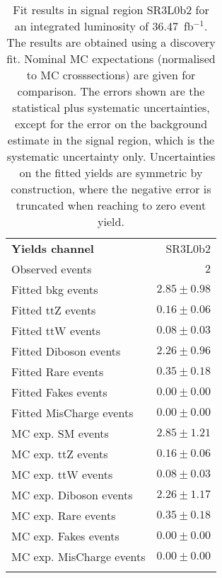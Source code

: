 

\begin{table}
\begin{center}
\setlength{\tabcolsep}{0.0pc}
{\small
\begin{tabular*}{\textwidth}{@{\extracolsep{\fill}}lr}
\noalign{\smallskip}\hline\noalign{\smallskip}
{\bfseries Yields channel}           & SR3L0b2              \\[-0.05cm]
\noalign{\smallskip}\hline\noalign{\smallskip}
Observed events          & $2$                    \\
\noalign{\smallskip}\hline\noalign{\smallskip}
Fitted bkg events         & $2.85 \pm 0.98$              \\
\noalign{\smallskip}\hline\noalign{\smallskip}
        Fitted ttZ events         & $0.16 \pm 0.06$              \\
        Fitted ttW events         & $0.08 \pm 0.03$              \\
        Fitted Diboson events         & $2.26 \pm 0.96$              \\
        Fitted Rare events         & $0.35 \pm 0.18$              \\
        Fitted Fakes events         & $0.00 \pm 0.00$              \\
        Fitted MisCharge events         & $0.00 \pm 0.00$              \\
 \noalign{\smallskip}\hline\noalign{\smallskip}
MC exp. SM events              & $2.85 \pm 1.21$              \\
\noalign{\smallskip}\hline\noalign{\smallskip}
        MC exp. ttZ events         & $0.16 \pm 0.06$              \\
        MC exp. ttW events         & $0.08 \pm 0.03$              \\
        MC exp. Diboson events         & $2.26 \pm 1.17$              \\
        MC exp. Rare events         & $0.35 \pm 0.18$              \\
        MC exp. Fakes events         & $0.00 \pm 0.00$              \\
        MC exp. MisCharge events         & $0.00 \pm 0.00$              \\
\noalign{\smallskip}\hline\noalign{\smallskip}
\end{tabular*}
}
\end{center}
\caption{Fit results in signal region SR3L0b2 for an integrated luminosity of 36.47~fb$^{-1}$.
The results are obtained using a discovery fit. Nominal MC expectations (normalised to MC crosssections) are given for comparison. 
The errors shown are the statistical plus systematic uncertainties, except for the error on the background estimate in the signal region, which is the systematic uncertainty only.
Uncertainties on the fitted yields are symmetric by construction, where the negative error is truncated when reaching to zero event yield.
}
\label{table.results.systematics.in.logL.fit..Yields.SR3L0b2}
\end{table}
\clearpage
%